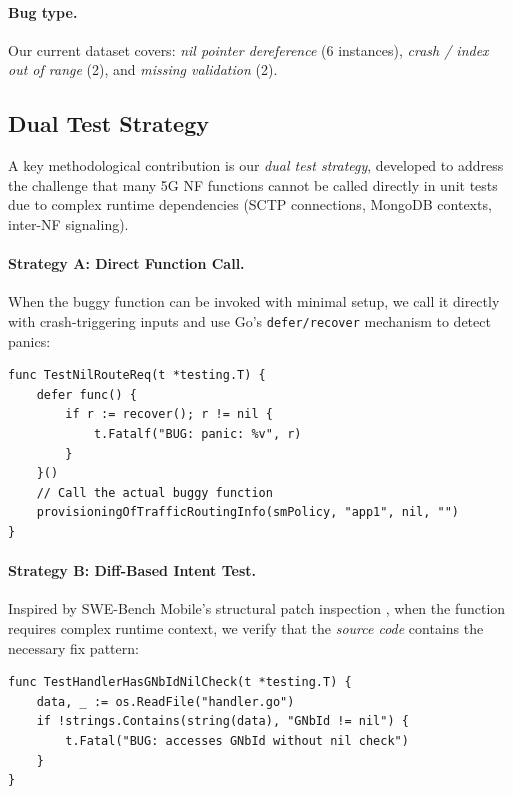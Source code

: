 \documentclass{article}
\begin{document}
\paragraph{Bug type.} Our current dataset covers: \emph{nil pointer dereference} (6 instances), \emph{crash / index out of range} (2), and \emph{missing validation} (2).

\subsection{Dual Test Strategy}

A key methodological contribution is our \emph{dual test strategy}, developed to address the challenge that many 5G NF functions cannot be called directly in unit tests due to complex runtime dependencies (SCTP connections, MongoDB contexts, inter-NF signaling).

\paragraph{Strategy A: Direct Function Call.} When the buggy function can be invoked with minimal setup, we call it directly with crash-triggering inputs and use Go's \texttt{defer/recover} mechanism to detect panics:

\begin{lstlisting}[caption={Strategy A: Direct function call (pilot\_pcf\_879)}]
func TestNilRouteReq(t *testing.T) {
    defer func() {
        if r := recover(); r != nil {
            t.Fatalf("BUG: panic: %v", r)
        }
    }()
    // Call the actual buggy function
    provisioningOfTrafficRoutingInfo(smPolicy, "app1", nil, "")
}
\end{lstlisting}

\paragraph{Strategy B: Diff-Based Intent Test.} Inspired by SWE-Bench Mobile's structural patch inspection \citep{yao2025swebenchmobile}, when the function requires complex runtime context, we verify that the \emph{source code} contains the necessary fix pattern:

\begin{lstlisting}[caption={Strategy B: Diff-based intent test (amf\_pr161)}]
func TestHandlerHasGNbIdNilCheck(t *testing.T) {
    data, _ := os.ReadFile("handler.go")
    if !strings.Contains(string(data), "GNbId != nil") {
        t.Fatal("BUG: accesses GNbId without nil check")
    }
}
\end{lstlisting}
\end{document}
